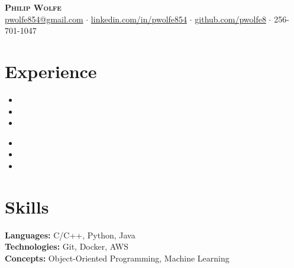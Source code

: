 \documentclass[11pt, a4paper]{article}
\newcommand{\header}[7]{
  \begin{center}
    {\LARGE \bfseries\scshape #1}\\
    \vspace{2mm}
    \href{mailto:#2}{#2} $\cdot$ \href{#3}{#6} $\cdot$ \href{#4}{#7} $\cdot$ #5\\
    \vspace{0mm}
  \end{center}
}
\begin{document}
\header{Philip Wolfe}{pwolfe854@gmail.com}{https://www.linkedin.com/in/pwolfe854}{https://github.com/pwolfe8}{256-701-1047}{linkedin.com/in/pwolfe854}{github.com/pwolfe8}

\section*{Experience}

\workplaceGTRI
\begin{itemize}
  \item \fpgaShort
  \item \fpgaMedium
  \item \fpgaLong
\end{itemize}

\workplaceBeam
\begin{itemize}
  \item \fpgaShort
  \item \fpgaMedium
  \item \fpgaLong
\end{itemize}


\educationSimple

\section*{Skills}
\textbf{Languages:} C/C++, Python, Java\\
\textbf{Technologies:} Git, Docker, AWS\\
\textbf{Concepts:} Object-Oriented Programming, Machine Learning
\end{document}
